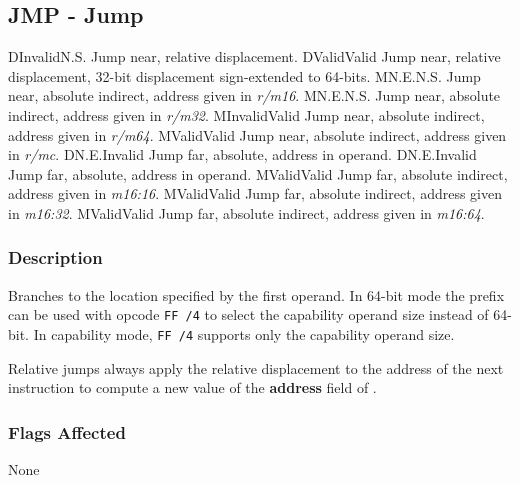 \clearpage
{}
{}
\subsection*{JMP - Jump}

\begin{x86opcodetable}
  {D}{Invalid}{N.S.}
  {Jump near, relative displacement.}
  {D}{Valid}{Valid}
  {Jump near, relative displacement, 32-bit displacement sign-extended
    to 64-bits.}
  {M}{N.E.}{N.S.}
  {Jump near, absolute indirect, address given in \emph{r/m16}.}
  {M}{N.E.}{N.S.}
  {Jump near, absolute indirect, address given in \emph{r/m32}.}
  {M}{Invalid}{Valid}
  {Jump near, absolute indirect, address given in \emph{r/m64}.}
  {M}{Valid}{Valid}
  {Jump near, absolute indirect, address given in \emph{r/mc}.}
  {D}{N.E.}{Invalid}
  {Jump far, absolute, address in operand.}
  {D}{N.E.}{Invalid}
  {Jump far, absolute, address in operand.}
  {M}{Valid}{Valid}
  {Jump far, absolute indirect, address given in \emph{m16:16}.}
  {M}{Valid}{Valid}
  {Jump far, absolute indirect, address given in \emph{m16:32}.}
  {M}{Valid}{Valid}
  {Jump far, absolute indirect, address given in \emph{m16:64}.}
\end{x86opcodetable}

\begin{x86opentable}
\end{x86opentable}

\subsubsection*{Description}

Branches to the location specified by the first operand.  In 64-bit
mode the  prefix can be used with opcode \texttt{FF /4}
to select the capability operand size instead of 64-bit.  In
capability mode, \texttt{FF /4} supports only the capability operand
size.

Relative jumps always apply the relative displacement to the address
of the next instruction to compute a new value of the \textbf{address}
field of \CIP{}.

\subsubsection*{Flags Affected}

None
